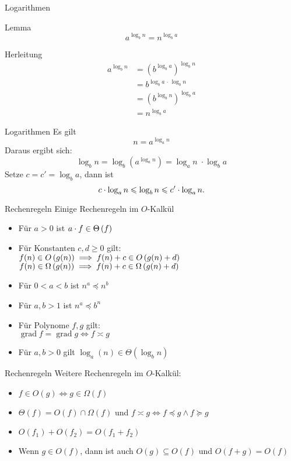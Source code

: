 \begin{frame}{Logarithmen}
	\begin{block}{Lemma}
		$$a^{\log_b n} = n^{\log_b a}$$
	\end{block}

	\begin{block}{Herleitung}
		\begin{align*}
			a^{\log_b n} &= \left( b ^{\log_b a} \right) ^{\log_b n}\\
						 &= b^{\log_b a \, \cdot \, \log_b n}\\
						 &= \left( b^{\log_b n} \right) ^{\log_b a}\\
						 &= n^{\log_b a}
		\end{align*}
	\end{block}
\end{frame}

\begin{frame}{Logarithmen}
	Es gilt $$n = a^{\log_a n}$$ \pause
	Daraus ergibt sich: $$ \log_b n = \log_b \left(a^{\log_a n}\right) = \log_a n \; \cdot \log_b a $$ \pause 
	Setze $c = c' = \log_b a$, dann ist $$c \cdot \log_a n \leqslant \log_b n \leqslant c' \cdot \log_a n.$$
\end{frame}

\begin{frame}{Rechenregeln}
	Einige Rechenregeln im $O$-Kalkül
	\begin{itemize}[<+->]
		\item Für $a > 0$ ist $a \cdot f \in \Theta\left(f\right)$ 
		\item Für Konstanten $c, d \geq 0$ gilt: \\ 
			\quad $f(n) \in \Oh{g(n)} \Impl f(n) + c \in \Oh{g(n) + d}$ \\
			\quad $f(n) \in \Om{g(n)} \Impl f(n) + c \in \Om{g(n) + d}$ \\
		\item Für $0 < a < b$ ist $n^a \preceq n^b$
		\item Für $a,b > 1$ ist $n^a \preceq b^n$ 
		\item Für Polynome $f,g$ gilt: \\
			\quad $\mathop{\text{grad}} f = \mathop{\text{grad}} g \iff f \asymp g $
		\item Für $a,b > 0$ gilt $\log_a(n) \in \Theta(\log_b n)$
		
	\end{itemize}
\end{frame}


\begin{frame}{Rechenregeln}
	Weitere Rechenregeln im $O$-Kalkül:
	\begin{itemize}[<+->]
		\item $f \in O(g) \iff g \in \Omega(f)$
		\item $\Theta(f) = O(f) \cap \Omega(f)$ und $f \asymp g \iff f \preceq g \wedge f \succeq g$ 
		\item $O(f_1) + O(f_2) = O(f_1 + f_2)$
		\item Wenn $g \in O(f)$, dann ist auch $O(g) \subseteq O(f)$ und $O(f + g) = O(f)$
	\end{itemize}
	
\end{frame}

